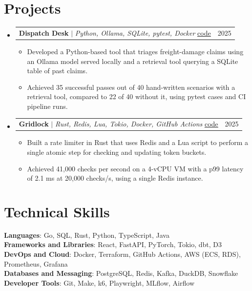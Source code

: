 \documentclass[letterpaper,11pt]{article}
\makeatletter
\newcommand{\resumeItem}[1]{
  \item\small{
    {#1 \vspace{-2pt}}
  }
}
\newcommand{\resumeProjectHeading}[2]{
    \item
    \begin{tabular*}{0.97\textwidth}{l@{\extracolsep{\fill}}r}
      \small#1 & #2 \\
    \end{tabular*}\vspace{-7pt}
}
\newcommand{\resumeSubHeadingListStart}{\begin{itemize}[leftmargin=0.15in, label={}]}
\newcommand{\resumeSubHeadingListEnd}{\end{itemize}}
\newcommand{\resumeItemListStart}{\begin{itemize}}
\newcommand{\resumeItemListEnd}{\end{itemize}\vspace{-5pt}}
\newcommand{\codelink}[1]{\href{#1}{\underline{code}}}
\makeatother
\begin{document}
\section{Projects}
    \resumeSubHeadingListStart
    \resumeProjectHeading{\textbf{Dispatch Desk} $|$ \emph{Python, Ollama, SQLite, pytest, Docker} \codelink{https://example.com/code/dispatch-desk}}{2025}
      \resumeItemListStart
        \resumeItem{Developed a Python-based tool that triages freight-damage claims using an Ollama model served locally and a retrieval tool querying a SQLite table of past claims.}
        \resumeItem{Achieved 35 successful passes out of 40 hand-written scenarios with a retrieval tool, compared to 22 of 40 without it, using pytest cases and CI pipeline runs.}
      \resumeItemListEnd
    \resumeProjectHeading{\textbf{Gridlock} $|$ \emph{Rust, Redis, Lua, Tokio, Docker, GitHub Actions} \codelink{https://example.com/code/gridlock}}{2025}
      \resumeItemListStart
        \resumeItem{Built a rate limiter in Rust that uses Redis and a Lua script to perform a single atomic step for checking and updating token buckets.}
        \resumeItem{Achieved 41,000 checks per second on a 4-vCPU VM with a p99 latency of 2.1 ms at 20,000 checks/s, using a single Redis instance.}
      \resumeItemListEnd
    \resumeSubHeadingListEnd

\section{Technical Skills}
 \begin{itemize}[leftmargin=0.15in, label={}]
    \small{\item{
     \textbf{Languages}{: Go, SQL, Rust, Python, TypeScript, Java} \\
     \textbf{Frameworks and Libraries}{: React, FastAPI, PyTorch, Tokio, dbt, D3} \\
     \textbf{DevOps and Cloud}{: Docker, Terraform, GitHub Actions, AWS (ECS, RDS), Prometheus, Grafana} \\
     \textbf{Databases and Messaging}{: PostgreSQL, Redis, Kafka, DuckDB, Snowflake} \\
     \textbf{Developer Tools}{: Git, Make, k6, Playwright, MLflow, Airflow}
    }}
 \end{itemize}
\end{document}
